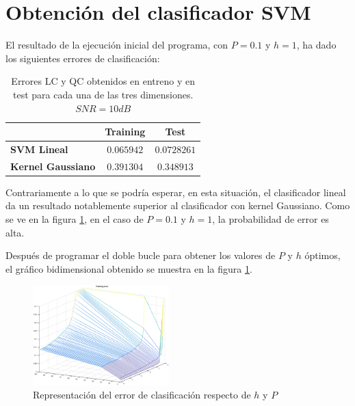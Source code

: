 \documentclass[11pt]{article} %
\begin{document}
\section{Obtención del clasificador SVM}

El resultado de la ejecución inicial del programa, con $P=0.1$ y $h=1$, ha dado los siguientes errores de clasificación:

\begin{table}[h]
	\begin{center}
		\begin{tabular}{| l | c | c |}
			\hline
			\diagbox[width=11em]{\textbf{Clasificador}}{\textbf{Fase}} & \textbf{Training} & \textbf{Test}\\
			\hline
			\textbf{SVM Lineal}     & $ 0.065942 $ & $ 0.0728261 $ \\
			\hline
			\textbf{Kernel Gaussiano} & $ 0.391304 $ & $ 0.348913 $ \\
			\hline
		\end{tabular}
		\caption{Errores LC y QC obtenidos en entreno y en test para cada una de las tres dimensiones. $SNR=10dB$}
		\label{tab:select:LC_QC}
	\end{center}
\end{table}

Contrariamente a lo que se podría esperar, en esta situación, el clasificador lineal da un resultado notablemente superior al clasificador con kernel Gaussiano. Como se ve en la figura \ref{fig:svm:p_h_optimo}, en el caso de $P=0.1$ y $h=1$, la probabilidad de error es alta.

Después de programar el doble bucle para obtener los valores de $P$ y $h$ óptimos, el gráfico bidimensional obtenido se muestra en la figura \ref{fig:svm:p_h_optimo}.

\begin{figure}[h]
	\centering
	\includegraphics[width=0.47\textwidth]{../s1_svm/3_train_error.eps}
	\caption[]{\small Representación del error de clasificación respecto de $h$ y $P$}
	\label{fig:svm:p_h_optimo}
\end{figure}
\end{document}
